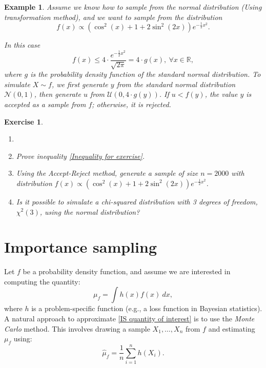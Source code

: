 \documentclass{article}\usepackage[]{graphicx}\usepackage[]{xcolor}
\newtheorem{exercise}{Exercise}
\newtheorem{example}{Example}
\begin{document}
\begin{example}\label{Generating a distr bounded by the normal distribution}
Assume we know how to sample from the normal distribution (Using transformation method), and we want to sample from the distribution 
\begin{equation*}
f(x) \propto \left( \cos^2(x) + 1 + 2\sin^2(2x)\right) e^{-\frac{1}{2} x^2}.
\end{equation*}

In this case 
\begin{equation}\label{Inequality for exercise}
f(x) \leq 4 \cdot \frac{e^{-\frac{1}{2}x^2}}{\sqrt{2\pi}} = 4\cdot g(x), ~\forall x \in \mathbb{R},
\end{equation}
where $g$ is the probability density function of the standard normal distribution. To simulate $X \sim f$, we first generate $y$ from the standard normal distribution $\mathcal{N}(0,1)$, then generate $u$ from $\mathcal{U}(0, 4\cdot g(y))$. If $u < f(y)$, the value $y$ is accepted as a sample from $f$; otherwise, it is rejected.

\end{example}

\begin{exercise}
\begin{enumerate}
\item[]
\item Prove inequality \eqref{Inequality for exercise}.
\item Using the Accept-Reject method, generate a sample of size $n=2000$ with distribution $f(x) \propto \left( \cos^2(x) + 1 + 2\sin^2(2x)\right) e^{-\frac{1}{2} x^2}$.
\item Is it possible to simulate a chi-squared distribution with 3 degrees of freedom, $\chi^2(3)$, using the normal distribution?
\end{enumerate}

\end{exercise}



\newpage
\section{Importance sampling}

Let $f$ be a probability density function, and assume we are interested in computing the quantity:
\begin{equation}\label{IS quantity of interest}
\mu_f = \int h(x)f(x)~dx,
\end{equation}
where $h$ is a problem-specific function (e.g., a loss function in Bayesian statistics). A natural approach to approximate \eqref{IS quantity of interest} is to use the \textit{Monte Carlo} method. This involves drawing a sample $X_1, \dots, X_n$ from $f$ and estimating $\mu_f$ using:
\begin{equation}\label{MC est of IS qoi}
\hat{\mu}_f = \frac{1}{n} \sum\limits_{i=1}^n h(X_i).
\end{equation}
\end{document}
